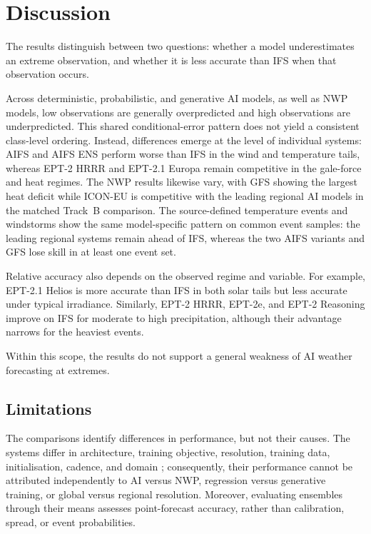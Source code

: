 \documentclass{article}
\begin{document}
\section{Discussion}

The results distinguish between two questions: whether a model
underestimates an extreme observation, and whether it is less accurate than
IFS when that observation occurs.

Across deterministic, probabilistic, and generative AI models, as well as
NWP models, low observations are generally overpredicted and high
observations are underpredicted. This shared conditional-error pattern does
not yield a consistent class-level ordering. Instead, differences emerge at
the level of individual systems: AIFS and AIFS ENS perform worse than IFS in
the wind and temperature tails, whereas EPT-2 HRRR and EPT-2.1 Europa remain
competitive in the gale-force and heat regimes. The NWP results likewise
vary, with GFS showing the largest heat deficit while ICON-EU is competitive
with the leading regional AI models in the matched Track~B comparison. The
source-defined temperature events and windstorms show the same
model-specific pattern on common event samples: the leading regional systems
remain ahead of IFS, whereas the two AIFS variants and GFS lose skill in at
least one event set.

Relative accuracy also depends on the observed regime and variable. For
example, EPT-2.1 Helios is more accurate than IFS in both solar tails but
less accurate under typical irradiance. Similarly, EPT-2 HRRR, EPT-2e, and
EPT-2 Reasoning improve on IFS for moderate to high precipitation, although
their advantage narrows for the heaviest events.

Within this scope, the results do not support a general weakness of AI
weather forecasting at extremes.


\subsection{Limitations}

The comparisons identify differences in performance, but not their causes.
The systems differ in architecture, training objective, resolution,
training data, initialisation, cadence, and domain
\citep{bonavita2024limitations,subich2025doublepenalty}; consequently,
their performance cannot be attributed independently to AI versus NWP,
regression versus generative training, or global versus regional
resolution. Moreover, evaluating ensembles through their means assesses
point-forecast accuracy, rather than calibration, spread, or event
probabilities.
\end{document}

